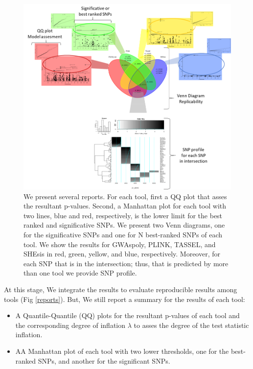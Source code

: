 \documentclass{article}
\begin{document}
\begin{figure}

\includegraphics[width=15cm]{images/Reportes_Metodologia.png}
\caption{We present several reports. For each tool, first a QQ plot that asses the resultant p-values.  Second, a Manhattan plot for each tool with two lines, blue and red, respectively, is the lower limit for the best ranked and significative SNPs. We present two Venn diagrams, one for the significative SNPs and one for N best-ranked SNPs of each tool. We show the results for GWAspoly, PLINK, TASSEL, and SHEsis in red, green, yellow, and blue, respectively. Moreover, for each SNP that is in the intersection; thus, that is predicted by more than one tool we provide SNP profile. \label{reports}}
\label{pipeline}
\end{figure}

At this stage, We integrate the results to evaluate reproducible results among tools (Fig \ref{reports}). But, We still report a summary for the results of each tool:
\begin{itemize}
    \item A Quantile-Quantile (QQ) plots for the resultant p-values of each tool and the corresponding degree of inflation $\lambda$ to asses the degree of the test statistic inflation.
    \item AA Manhattan plot of each tool with two lower thresholds, one for the best-ranked SNPs, and another for the significant SNPs. 
\end{itemize}
\end{document}

